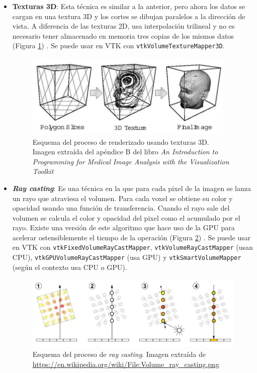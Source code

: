 \begin{itemize}
	\item \textbf{Texturas 3D}: Esta técnica es similar a la anterior, pero ahora los datos se cargan en una textura 3D y los cortes se dibujan paralelos a la dirección de vista. A diferencia de las texturas 2D, usa interpolación trilineal y no es necesario tener almacenado en memoria tres copias de los mismos datos (Figura \ref{fig:texturas3d}) \cite{intro_medical_vtk_bioimage}. Se puede usar en VTK con \texttt{vtkVolumeTextureMapper3D}.
	\begin{figure}[H]
		\centering
		\includegraphics[width=10cm]{imagenes/texturas3d}
		\caption{Esquema del proceso de renderizado usando texturas 3D. Imagen extraída del apéndice B del libro \textit{An Introduction to Programming for Medical Image Analysis with the Visualization Toolkit} \cite{intro_medical_vtk_bioimage}}
		\label{fig:texturas3d}
	\end{figure}
	
	\item \textbf{\textit{Ray casting}}: Es una técnica en la que para cada pixel de la imagen se lanza un rayo que atraviesa el volumen. Para cada voxel se obtiene su color y opacidad usando una función de transferencia. Cuando el rayo sale del volumen se calcula el color y opacidad del pixel como el acumulado por el rayo. Existe una versión de este algoritmo que hace uso de la GPU para acelerar ostensiblemente el tiempo de la operación (Figura \ref{fig:volume_ray_casting}) \cite{intro_medical_vtk_bioimage}. Se puede usar en VTK con \texttt{vtkFixedVolumeRayCastMapper}, \texttt{vtkVolumeRayCastMapper} (usan CPU), \texttt{vtkGPUVolumeRayCastMapper} (usa GPU) y \texttt{vtkSmartVolumeMapper} (según el contexto usa CPU o GPU).
	\begin{figure}[H]
		\centering
		\includegraphics[width=12.5cm]{imagenes/volume_ray_casting}
		\caption{Esquema del proceso de \textit{ray casting}. Imagen extraída de \url{https://en.wikipedia.org/wiki/File:Volume_ray_casting.png}}
		\label{fig:volume_ray_casting}
	\end{figure}
\end{itemize}

